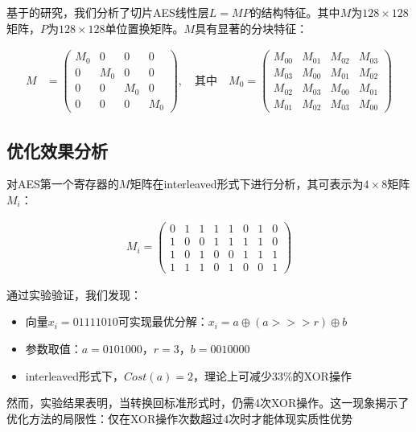 \documentclass[11pt,a4paper]{article}
\newcommand{\ggg}{\mathrel{>\!\!>\!\!>}}
\begin{document}
基于\cite{Adomnicai2021}的研究，我们分析了切片AES线性层$L=MP$的结构特征。其中$M$为$128 \times 128$矩阵，$P$为$128 \times 128$单位置换矩阵。$M$具有显著的分块特征：

\begin{align}
M &= \begin{pmatrix}
    M_0 & 0 & 0 & 0 \\
    0 & M_0 & 0 & 0 \\
    0 & 0 & M_0 & 0 \\
    0 & 0 & 0 & M_0
\end{pmatrix}, \quad \text{其中} \quad
M_0 = \begin{pmatrix}
    M_{00} & M_{01} & M_{02} & M_{03} \\
    M_{03} & M_{00} & M_{01} & M_{02} \\
    M_{02} & M_{03} & M_{00} & M_{01} \\
    M_{01} & M_{02} & M_{03} & M_{00}
\end{pmatrix}
\end{align}

\subsection{优化效果分析}

对AES第一个寄存器的$M$矩阵在interleaved形式下进行分析，其可表示为$4\times8$矩阵$M_i$：

\begin{align}
M_i = \begin{pmatrix}
    0 & 1 & 1 & 1 & 1 & 0 & 1 & 0 \\
    1 & 0 & 0 & 1 & 1 & 1 & 1 & 0 \\
    1 & 0 & 1 & 0 & 0 & 1 & 1 & 1 \\
    1 & 1 & 1 & 0 & 1 & 0 & 0 & 1
\end{pmatrix}
\end{align}

通过实验验证，我们发现：

\begin{itemize}
\item 向量$x_i = 01111010$可实现最优分解：$x_i = a \oplus (a \ggg r) \oplus b$
\item 参数取值：$a = 0101000$，$r = 3$，$b = 0010000$
\item interleaved形式下，$Cost(a) = 2$，理论上可减少33\%的XOR操作
\end{itemize}

然而，实验结果表明，当转换回标准形式时，仍需4次XOR操作。这一现象揭示了\cite{Leurent2024}优化方法的局限性：仅在XOR操作次数超过4次时才能体现实质性优势




\end{document}
